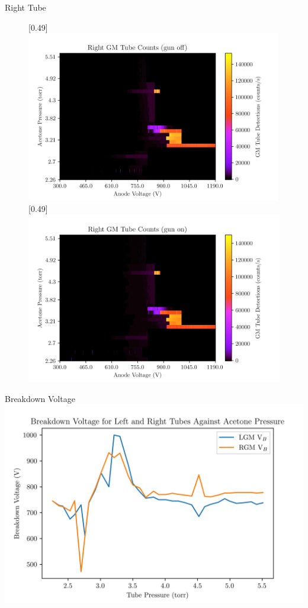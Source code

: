 \documentclass[12pt, aspectratio=169]{beamer}
\begin{document}
\begin{frame}{Right Tube}
    \begin{figure}[h!]
        \centering
        \subcaptionbox*{}[0.49\linewidth]{\includegraphics[scale=0.45]{Figs/RGMGunOff.jpg}}
        \subcaptionbox*{}[0.49\linewidth]{\includegraphics[scale=0.45]{Figs/RGMGunOn.jpg}}
    \end{figure}
\end{frame}

\begin{frame}{Breakdown Voltage}
    \centering
    \includegraphics[scale=0.75]{Figs/VB.jpg}
\end{frame}
\end{document}

